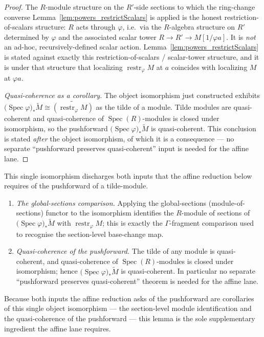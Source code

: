 \begin{proof}
  The \(R\)-module structure on the \(R'\)-side sections to which the ring-change
  converse Lemma~\ref{lem:powers_restrictScalars} is applied is the honest
  restriction-of-scalars structure: \(R\) acts through \(\varphi\), i.e.\ via the
  \(R\)-algebra structure on \(R'\) determined by \(\varphi\) and the associated
  scalar tower \(R \to R' \to M[1/\varphi a]\). It is \emph{not} an ad-hoc,
  recursively-defined scalar action. Lemma~\ref{lem:powers_restrictScalars} is
  stated against exactly this restriction-of-scalars / scalar-tower structure, and
  it is under that structure that localizing \(\operatorname{restr}_\varphi M\) at
  \(a\) coincides with localizing \(M\) at \(\varphi a\).

  \medskip
  \emph{Quasi-coherence as a corollary.} The object isomorphism just constructed
  exhibits \(\bigl(\operatorname{Spec}\varphi\bigr)_*\widetilde{M} \cong
  \widetilde{(\operatorname{restr}_\varphi M)}\) as the tilde of a module. Tilde
  modules are quasi-coherent and quasi-coherence of \(\operatorname{Spec}(R)\)-modules
  is closed under isomorphism, so the pushforward
  \(\bigl(\operatorname{Spec}\varphi\bigr)_*\widetilde{M}\) is quasi-coherent. This
  conclusion is stated \emph{after} the object isomorphism, of which it is a
  consequence — no separate ``pushforward preserves quasi-coherent'' input is
  needed for the affine lane.
\end{proof}

\begin{remark}
  This single isomorphism discharges both inputs that the affine reduction below
  requires of the pushforward of a tilde-module.
  \begin{enumerate}
    \item \emph{The global-sections comparison.} Applying the global-sections
      (module-of-sections) functor to the isomorphism identifies the
      \(R\)-module of sections of
      \(\bigl(\operatorname{Spec}\varphi\bigr)_*\widetilde{M}\) with
      \(\operatorname{restr}_\varphi M\); this is exactly the \(\Gamma\)-fragment
      comparison used to recognise the section-level base-change map.
    \item \emph{Quasi-coherence of the pushforward.} The tilde of any module is
      quasi-coherent, and quasi-coherence of \(\operatorname{Spec}(R)\)-modules is
      closed under isomorphism; hence
      \(\bigl(\operatorname{Spec}\varphi\bigr)_*\widetilde{M}\) is quasi-coherent.
      In particular no separate ``pushforward preserves quasi-coherent'' theorem is
      needed for the affine lane.
  \end{enumerate}
  Because both inputs the affine reduction asks of the pushforward are corollaries
  of this single object isomorphism — the section-level module identification and
  the quasi-coherence of the pushforward — this lemma is the sole supplementary
  ingredient the affine lane requires.
\end{remark}

